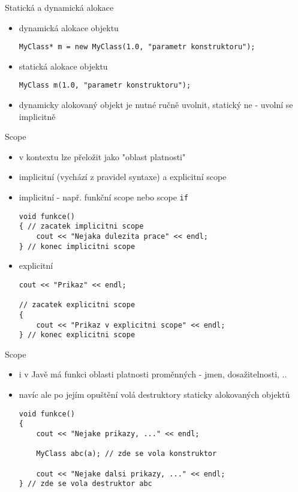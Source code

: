 \documentclass{beamer}
\begin{document}
\begin{xframe}{Statická a dynamická alokace}
	\begin{itemize}
		\item dynamická alokace objektu
\begin{lstlisting}[basicstyle=\fontsize{9}{10}\selectfont\ttfamily]
MyClass* m = new MyClass(1.0, "parametr konstruktoru");
\end{lstlisting}
		\item statická alokace objektu
\begin{lstlisting}[basicstyle=\fontsize{9}{10}\selectfont\ttfamily]
MyClass m(1.0, "parametr konstruktoru");
\end{lstlisting}

		\item dynamicky alokovaný objekt je nutné ručně uvolnit, statický ne - uvolní se implicitně
	\end{itemize}
\end{xframe}


\begin{xframe}{Scope}
	\begin{itemize}
		\item v kontextu lze přeložit jako "oblast platnosti"
		\item implicitní (vychází z pravidel syntaxe) a explicitní scope
		\item implicitní - např. funkční scope nebo scope \texttt{if}
\begin{lstlisting}[basicstyle=\fontsize{9}{10}\selectfont\ttfamily]
void funkce()
{ // zacatek implicitni scope
    cout << "Nejaka dulezita prace" << endl;
} // konec implicitni scope
\end{lstlisting}
		\item explicitní
\begin{lstlisting}[basicstyle=\fontsize{9}{10}\selectfont\ttfamily]
cout << "Prikaz" << endl;

// zacatek explicitni scope
{
    cout << "Prikaz v explicitni scope" << endl;
} // konec explicitni scope
\end{lstlisting}

	\end{itemize}
\end{xframe}


\begin{xframe}{Scope}
	\begin{itemize}
		\item i v Javě má funkci oblasti platnosti proměnných - jmen, dosažitelnosti, ..
		\item navíc ale po jejím opuštění volá destruktory staticky alokovaných objektů
		
\begin{lstlisting}[basicstyle=\fontsize{9}{10}\selectfont\ttfamily]
void funkce()
{
    cout << "Nejake prikazy, ..." << endl;
    
    MyClass abc(a); // zde se vola konstruktor
    
    cout << "Nejake dalsi prikazy, ..." << endl;
} // zde se vola destruktor abc
\end{lstlisting}
	\end{itemize}
\end{xframe}
\end{document}
